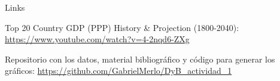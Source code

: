 \documentclass{beamer}
\let\tempone\itemize
\let\temptwo\enditemize
\renewenvironment{itemize}{\tempone\addtolength{\itemsep}{0.5\baselineskip}}{\temptwo}
\begin{document}
	\begin{frame}{Links}
		\begin{itemize}
			\item Top 20 Country GDP (PPP) History \& Projection (1800-2040):  \href{https://www.youtube.com/watch?v=4-2nqd6-ZXg}{https://www.youtube.com/watch?v=4-2nqd6-ZXg}
			\item Repositorio con los datos, material bibliográfico y código para generar los gráficos: \href{https://github.com/GabrielMerlo/DyB_actividad_1}{https://github.com/GabrielMerlo/DyB\_actividad\_1}
		\end{itemize}
	\end{frame}
\end{document}
